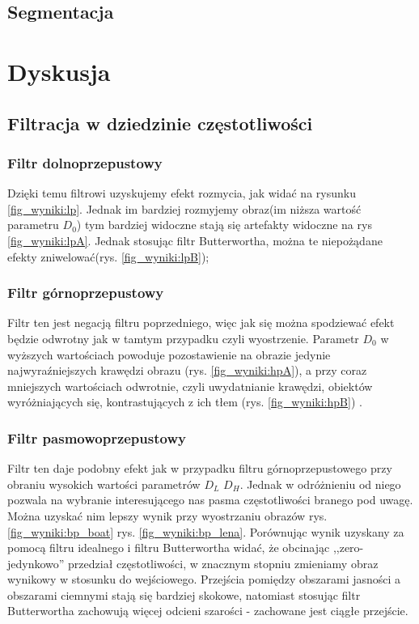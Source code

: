 \documentclass{classrep}
\begin{document}
\subsection{Segmentacja}





\section{Dyskusja}

\subsection{Filtracja w dziedzinie częstotliwości}

\subsubsection{Filtr dolnoprzepustowy}
Dzięki temu filtrowi uzyskujemy efekt rozmycia, jak widać na rysunku \ref{fig_wyniki:lp}. Jednak im bardziej rozmyjemy obraz(im niższa wartość parametru $D_0$) tym bardziej widoczne stają się artefakty widoczne na rys \ref{fig_wyniki:lpA}. Jednak stosując filtr Butterwortha, można te niepożądane efekty zniwelować(rys. \ref{fig_wyniki:lpB});

\subsubsection{Filtr górnoprzepustowy}

Filtr ten jest negacją filtru poprzedniego, więc jak się można spodziewać efekt będzie odwrotny jak w tamtym przypadku czyli wyostrzenie. Parametr $D_0$ w wyższych wartościach powoduje pozostawienie na obrazie jedynie najwyraźniejszych krawędzi obrazu (rys. \ref{fig_wyniki:hpA}), a przy coraz mniejszych wartościach odwrotnie, czyli uwydatnianie krawędzi, obiektów wyróżniających się, kontrastujących z ich tłem (rys. \ref{fig_wyniki:hpB}) .

\subsubsection{Filtr pasmowoprzepustowy}

Filtr ten daje podobny efekt jak w przypadku filtru górnoprzepustowego przy obraniu wysokich wartości parametrów  $D_L$ $D_H$.
Jednak w odróżnieniu od niego pozwala na wybranie interesującego nas pasma częstotliwości branego pod uwagę. Można uzyskać nim lepszy wynik przy wyostrzaniu obrazów  rys. \ref{fig_wyniki:bp_boat}  rys. \ref{fig_wyniki:bp_lena}. Porównując wynik uzyskany za pomocą filtru idealnego i filtru Butterwortha widać, że obcinając ,,zero-jedynkowo'' przedział częstotliwości, w znacznym stopniu zmieniamy obraz wynikowy w stosunku do wejściowego. Przejścia pomiędzy obszarami jasności a obszarami ciemnymi stają się bardziej skokowe, natomiast stosując filtr Butterwortha zachowują więcej odcieni szarości - zachowane jest ciągłe przejście.
\end{document}

